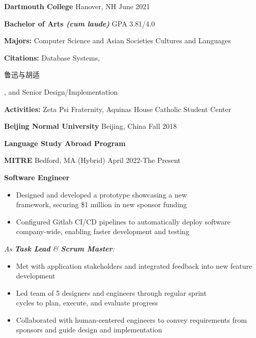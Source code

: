 \documentclass[10pt,a4paper,ragged2e,withhyper]{altacv}
\begin{document}
\begin{paracol}{2}


\large\color{emphasis}\textbf{Dartmouth College} \small\faUniversity Hanover, NH
\hfill\small\faGraduationCap June 2021\par
\textbf{\color{subheading}Bachelor of Arts \textit{(cum laude)}} \hfill GPA 3.81/4.0\par
\textbf{Majors:} Computer Science and Asian Societies Cultures and Languages \par
\textbf{Citations:} Database Systems, \begin{CJK*}{UTF8}{gbsn}鲁迅与胡适\end{CJK*}, and Senior Design/Implementation \par
\textbf{Activities:} Zeta Psi Fraternity, Aquinas House Catholic Student Center \par
\medskip
\large\color{emphasis}\textbf{Beijing Normal University} \small\faUniversity Beijing, China
\hfill\small\faGraduationCap Fall 2018\par
\textbf{\color{subheading}Language Study Abroad Program}\par


\large\color{emphasis}\textbf{MITRE} \small\faSuitcase Bedford, MA (Hybrid)
\hfill\small\faCalendar April 2022-The Present\par
\textbf{\color{subheading}Software Engineer}\par
\smallskip
\normalsize

\begin{itemize}
\item Designed and developed a prototype showcasing a new \\ framework, securing \$1 million in new sponsor funding
\item Configured Gitlab CI/CD pipelines to automatically deploy software company-wide, enabling faster development and testing
\end{itemize}
\smallskip
\textit{As \textbf{Task Lead} \& \textbf{Scrum Master}:}
\begin{itemize}
\item Met with application stakeholders and integrated feedback into new feature development
\item Led team of 5 designers and engineers through regular sprint \\ cycles to plan, execute, and evaluate progress
\item Collaborated with human-centered engineers to convey requirements from sponsors and guide design and implementation
\end{itemize}
\divider


\end{paracol}
\end{document}
